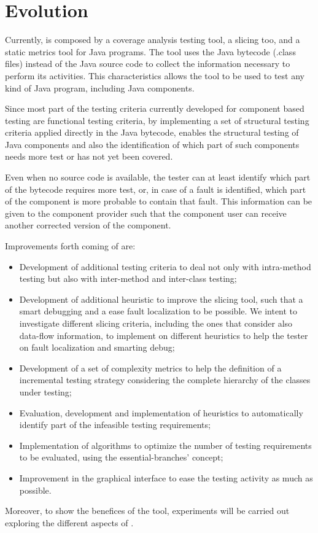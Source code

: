 \section{\toolname Evolution}\label{sec:evolution}

Currently, \toolname is composed by a coverage analysis testing
tool, a slicing too, and a static metrics tool for Java programs.
The tool uses the Java bytecode (.class files) instead of the Java
source code to collect the information necessary to perform its
activities. This characteristics allows the tool to be used to
test any kind of Java program, including Java components.

Since most part of the testing criteria currently developed for
component based testing are functional testing criteria, by
implementing a set of structural testing criteria applied directly
in the Java bytecode, \toolname enables the structural testing of
Java components and also the identification of which part of such
components needs more test or has not yet been covered.

Even when no source code is available, the tester can at least
identify which part of the bytecode requires more test, or, in
case of a fault is identified, which part of the component is more
probable to contain that fault. This information can be given to
the component provider such that the component user can receive
another corrected version of the component.

Improvements forth coming of \toolname are:

\begin{itemize}
    \item Development of additional testing criteria to deal not
    only with intra-method testing but also with inter-method and
    inter-class testing;

    \item Development of additional heuristic to improve the slicing
    tool, such that a smart debugging and a ease fault localization to
    be possible. We intent to investigate different slicing criteria,
    including the ones that consider also data-flow information, to implement
    on \toolname different heuristics to help the tester on fault localization
    and smarting debug;

    \item Development of a set of complexity metrics to help the definition
    of a incremental testing strategy considering the complete hierarchy of
    the classes under testing;

    \item Evaluation, development and implementation of heuristics
    to automatically identify part of the infeasible testing
    requirements;

    \item Implementation of algorithms to optimize the number of
    testing requirements to be evaluated, using the
    essential-branches' concept;

    \item Improvement in the graphical interface to ease the
    testing activity as much as possible.
\end{itemize}

Moreover, to show the benefices of the tool, experiments will be
carried out exploring the different aspects of \toolname.
